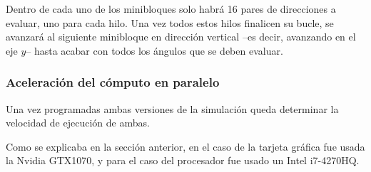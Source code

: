 Dentro de cada uno de los minibloques solo habrá 16 pares de direcciones a evaluar, uno para cada hilo.
Una vez todos estos hilos finalicen su bucle, se avanzará al siguiente minibloque en dirección vertical --es decir, avanzando en el eje $y$-- hasta acabar con todos los ángulos que se deben evaluar.

\subsubsection{Aceleración del cómputo en paralelo}

Una vez programadas ambas versiones de la simulación queda determinar la velocidad de ejecución de ambas.

Como se explicaba en la sección anterior, en el caso de la tarjeta gráfica fue usada la Nvidia GTX1070, y para el caso del procesador fue usado un Intel i7-4270HQ.


